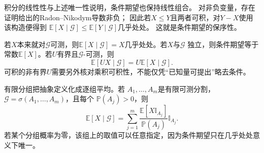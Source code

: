 积分的线性性与上述唯一性说明，条件期望也保持线性组合。
对非负变量，存在证明给出的Radon--Nikodym导数非负；
因此若\(X\leq Y\)且两者可积，对\(Y-X\)使用该构造便得到
\(\mathbb E[X\mid\mathcal G]\leq\mathbb E[Y\mid\mathcal G]\)几乎处处。
这就是条件期望的保序性。

若\(X\)本来就对\(\mathcal{G}\)可测，则\(\mathbb{E}[X\mid\mathcal{G}]=X\)几乎处处。若\(X\)与\(\mathcal{G}\)
独立，则条件期望等于常数\(\mathbb{E}[X]\)。若\(U\)有界且\(\mathcal{G}\)-可测，则
\begin{equation}
  \mathbb{E}[UX\mid\mathcal{G}]
  =
  U\mathbb{E}[X\mid\mathcal{G}].
  \label{eq:probability-taking-out-known-factor}
\end{equation}
可积的非有界\(U\)需要另外核对乘积可积性，不能仅凭“已知量可提出”略去条件。

有限分组把抽象定义化成逐组平均。若
\(A_1,\ldots,A_m\)是有限可测分割，
\(\mathcal{G}=\sigma(A_1,\ldots,A_m)\)，且每个
\(\mathbb{P}(A_j)>0\)，则
\begin{equation}
  \mathbb{E}[X\mid\mathcal{G}]
  =
  \sum_{j=1}^{m}
  \frac{\mathbb{E}[X\mathbb{I}_{A_j}]}
       {\mathbb{P}(A_j)}
  \mathbb{I}_{A_j}.
  \label{eq:probability-finite-partition-conditional-expectation}
\end{equation}
若某个分组概率为零，该组上的取值可以任意指定，因为条件期望只在几乎处处意义下唯一。

